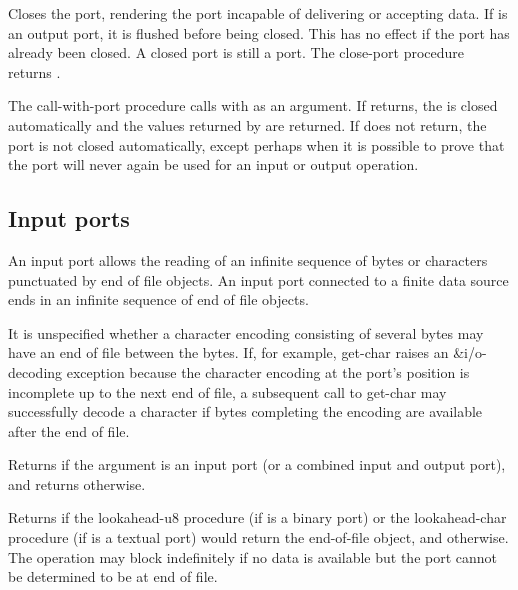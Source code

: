 \begin{entry}{%
}
   
Closes the port, rendering the port incapable of delivering or
accepting data. If  is an output port, it is flushed before
being closed.  This has no effect if the port has already been closed.
A closed port is still a port.  The {\cf close-port} procedure returns
\unspecifiedreturn.
\end{entry}

\begin{entry}{%
}
   
The {\cf call-with-port} procedure
calls  with  as an argument. If
 returns, the  is closed automatically and
the values returned by  are returned. If  does not
return, the port is not closed automatically, except perhaps when it is
possible to prove that the port will never again be used for an
input or output operation.
\end{entry}

\subsection{Input ports}

An input port allows the reading of an infinite sequence of bytes
or characters punctuated
by end of file objects. An input port connected to a finite data
source ends in an infinite sequence of end of file objects.

It is unspecified whether a character encoding consisting of several
bytes may have an end of file between the bytes.  If, for example,
{\cf get-char} raises an {\cf\&i/o-decoding} exception because the
character encoding at the port's position is incomplete up to the next
end of file, a subsequent call to {\cf get-char} may successfully
decode a character if bytes completing the encoding are available
after the end of file.

\begin{entry}{%
}

Returns \schtrue{} if the argument is an input port (or a combined input
and output port), and returns \schfalse{} otherwise.
\end{entry}

\begin{entry}{%
}
   
Returns \schtrue{}
if the {\cf lookahead-u8} procedure (if  is a binary port)
or the {\cf lookahead-char} procedure (if  is a textual port)
would return
the end-of-file object, and \schfalse{} otherwise.
The operation may block indefinitely if no data is available
but the port cannot be determined to be at end of file.
\end{entry}

